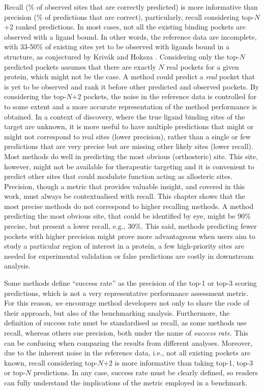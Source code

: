 Recall (\% of observed sites that are correctly predicted) is more informative than precision (\% of predictions that are correct), particularly, recall considering top-$N$+2 ranked predictions. In most cases, not all the existing binding pockets are observed with a ligand bound. In other words, the reference data are incomplete, with 33-50\% of existing sites yet to be observed with ligands bound in a structure, as conjectured by Krivák and Hoksza \cite{KRIVAK_2018_P2RANK}. Considering only the top-$N$ predicted pockets assumes that there are exactly $N$ real pockets for a given protein, which might not be the case. A method could predict a \textit{real} pocket that is yet to be observed and rank it before other predicted and observed pockets. By considering the top-$N$+2 pockets, the noise in the reference data is controlled for to some extent and a more accurate representation of the method performance is obtained. In a context of discovery, where the true ligand binding sites of the target are unknown, it is more useful to have multiple predictions that might or might not correspond to real sites (lower precision), rather than a single or few predictions that are very precise but are missing other likely sites (lower recall). Most methods do well in predicting the most obvious (orthosteric) site. This site, however, might not be available for therapeutic targeting and it is convenient to predict other sites that could modulate function acting as allosteric sites. Precision, though a metric that provides valuable insight, and covered in this work, must always be contextualised with recall. This chapter shows that the most precise methods do not correspond to higher recalling methods. A method predicting the most obvious site, that could be identified by eye, might be 90\% precise, but present a lower recall, e.g., 30\%. This said, methods predicting fewer pockets with higher precision might prove more advantageous when users aim to study a particular region of interest in a protein, a few high-priority sites are needed for experimental validation or false predictions are costly in downstream analysis. 

Some methods define ``success rate'' as the precision of the top-1 or top-3 scoring predictions, which is not a very representative performance assessment metric. For this reason, \textit{we} encourage method developers not only to share the code of their approach, but also of the benchmarking analysis. Furthermore, the definition of success rate must be standardised as recall, as some methods use recall, whereas others sue precision, both under the name of \textit{success rate}. This can be confusing when comparing the results from different analyses. Moreover, due to the inherent noise in the reference data, i.e., not all existing pockets are known, recall considering top-$N$+2 is more informative than taking top-1, top-3 or top-$N$ predictions. In any case, success rate must be clearly defined, so readers can fully understand the implications of the metric employed in a benchmark.

